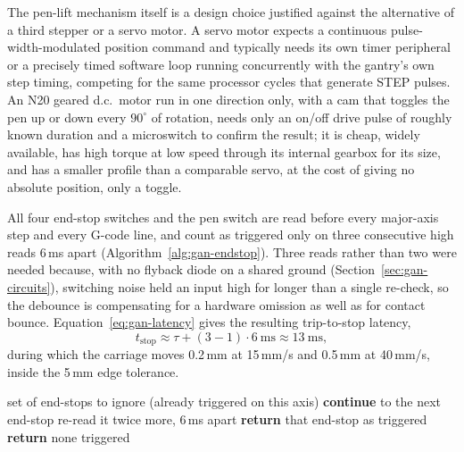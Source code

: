 The pen-lift mechanism itself is a design choice justified against the alternative of a third stepper or a servo motor. A servo motor expects a continuous pulse-width-modulated position command and typically needs its own timer peripheral or a precisely timed software loop running concurrently with the gantry's own step timing, competing for the same processor cycles that generate STEP pulses. An N20 geared d.c.\ motor run in one direction only, with a cam that toggles the pen up or down every $90^\circ$ of rotation, needs only an on/off drive pulse of roughly known duration and a microswitch to confirm the result; it is cheap, widely available, has high torque at low speed through its internal gearbox for its size, and has a smaller profile than a comparable servo, at the cost of giving no absolute position, only a toggle.

All four end-stop switches and the pen switch are read before every major-axis step and every G-code line, and count as triggered only on three consecutive high reads 6\,ms apart (Algorithm~\ref{alg:gan-endstop}). Three reads rather than two were needed because, with no flyback diode on a shared ground (Section~\ref{sec:gan-circuits}), switching noise held an input high for longer than a single re-check, so the debounce is compensating for a hardware omission as well as for contact bounce. Equation~\ref{eq:gan-latency} gives the resulting trip-to-stop latency,
\begin{equation}
t_{\mathrm{stop}}\approx\tau+(3-1)\cdot6\ \mathrm{ms}\approx13\ \mathrm{ms},
\label{eq:gan-latency}
\end{equation}
during which the carriage moves 0.2\,mm at 15\,mm/s and 0.5\,mm at 40\,mm/s, inside the 5\,mm edge tolerance.

\begin{algorithm}[!htbp]
\caption{Debounced end-stop read, called before every major-axis pulse}
\label{alg:gan-endstop}
\begin{algorithmic}[1]
\REQUIRE set of end-stops to ignore (already triggered on this axis)
        \STATE \textbf{continue} to the next end-stop
    \ENDIF
    \STATE re-read it twice more, 6\,ms apart 
        \STATE \textbf{return} that end-stop as triggered
    \ENDIF
\ENDFOR
\STATE \textbf{return} none triggered
\end{algorithmic}
\end{algorithm}

